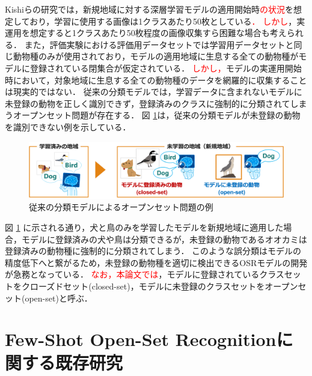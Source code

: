 \documentclass[a4paper,11pt,nomag]{jsreport}
\begin{document}
Kishiらの研究では，新規地域に対する深層学習モデルの適用開始時\textcolor{red}{の状況}を想定しており，学習に使用する画像は1クラスあたり50枚としている\textcolor{red}{．}
\textcolor{red}{しかし}，実運用を想定すると1クラスあたり50枚程度の画像収集すら困難な場合も考えられる．
また，評価実験における評価用データセットでは学習用データセットと同じ動物種のみが使用されており，モデルの適用地域に生息する全ての動物種がモデルに登録されている閉集合が仮定されている．
\textcolor{red}{しかし，}モデルの実運用開始時において，対象地域に生息する全ての動物種のデータを網羅的に収集することは現実的ではない．
従来の分類モデルでは，学習データに含まれないモデルに未登録の動物を正しく識別できず，登録済みのクラスに強制的に分類されてしまうオープンセット問題が存在する．
図 \ref{fig:non_osr}は，従来の分類モデルが未登録の動物を識別できない例を示している．
% 
\begin{figure}[tbp]
  \centering
  \includegraphics[width=\linewidth, keepaspectratio]{image/non_osr.png}
  \caption{従来の分類モデルによるオープンセット問題の例}
  \label{fig:non_osr}
\end{figure}
% 
図 \ref{fig:non_osr} に示される通り，犬と鳥のみを学習したモデルを新規地域に適用した場合，モデルに登録済みの犬や鳥は分類できるが，未登録の動物であるオオカミは登録済みの動物種に強制的に分類されてしまう．
このような誤分類はモデルの精度低下へと繋がるため，未登録の動物種を適切に検出できるOSRモデルの開発が急務となっている．
\textcolor{red}{なお，本論文では}，モデルに登録されているクラスセットをクローズドセット(closed-set)，モデルに未登録のクラスセットをオープンセット(open-set)と呼ぶ．


\section{Few-Shot Open-Set Recognitionに関する既存研究}
\end{document}
